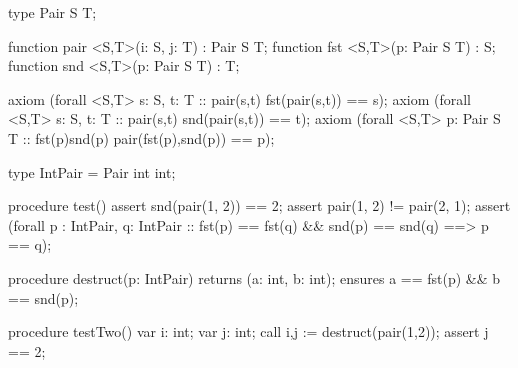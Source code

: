 type Pair S T;

function pair <S,T>(i: S, j: T) : Pair S T;
function fst <S,T>(p: Pair S T) : S;
function snd <S,T>(p: Pair S T) : T;

axiom (forall <S,T> s: S, t: T :: 
    {pair(s,t)} fst(pair(s,t)) == s);
axiom (forall <S,T> s: S, t: T :: 
    {pair(s,t)} snd(pair(s,t)) == t);
axiom (forall <S,T> p: Pair S T :: 
    {fst(p)}{snd(p)} pair(fst(p),snd(p)) == p);

type IntPair = Pair int int;

procedure test() {
    assert snd(pair(1, 2)) == 2;
    assert pair(1, 2) != pair(2, 1);
    assert (forall p : IntPair, q: IntPair ::
    fst(p) == fst(q) && snd(p) == snd(q) ==> p == q);  
}

procedure destruct(p: IntPair) returns (a: int, b: int);
    ensures a == fst(p) && b == snd(p);

procedure testTwo()
{
    var i: int; 
    var j: int;
    call i,j := destruct(pair(1,2));
    assert j == 2;
}

